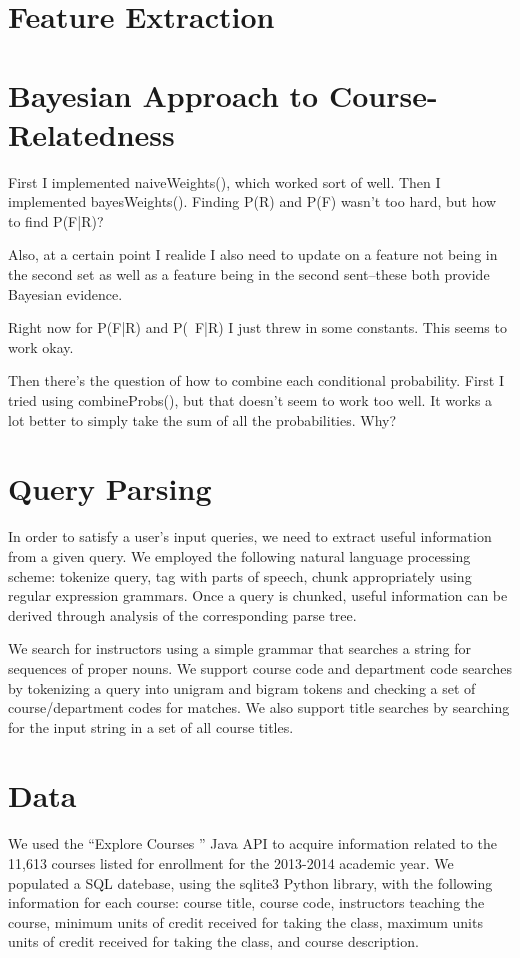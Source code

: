\documentclass[12pt]{article}
\begin{document}
\section*{Feature Extraction}



\section*{Bayesian Approach to Course-Relatedness}
First I implemented naiveWeights(), which worked sort of well. Then I implemented bayesWeights(). Finding P(R) and P(F) wasn't too hard, but how to find P(F|R)?

Also, at a certain point I realide I also need to update on a feature not being in the second set as well as a feature being in the second sent--these both provide Bayesian evidence.

Right now for P(F|R) and P(~F|R) I just threw in some constants. This seems to work okay.

Then there's the question of how to combine each conditional probability. First I tried using combineProbs(), but that doesn't seem to work too well. It works a lot better to simply take the sum of all the probabilities. Why?

\section*{Query Parsing}
In order to satisfy a user's input queries, we need to extract useful information from a given query. We employed the following natural language processing scheme: tokenize query, tag with parts of speech, chunk appropriately using regular expression grammars. Once a query is chunked, useful information can be derived through analysis of the corresponding parse tree. 

We search for instructors using a simple grammar that searches a string for sequences of proper nouns. We support course code and department code searches by tokenizing a query into unigram and bigram tokens and checking a set of course/department codes for matches. We also support title searches by searching for the input string in a set of all course titles.

\section*{Data}
	 We used the ``Explore Courses '' Java API to acquire information related to the 11,613 courses listed for enrollment for the 2013-2014 academic year. We populated a SQL datebase, using the sqlite3 Python library, with the following information for each course: course title, course code, instructors teaching the course, minimum units of credit received for taking the class, maximum units units of credit received for taking the class, and course description. 
\end{document}
